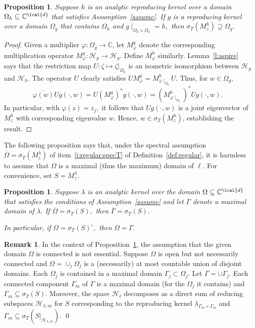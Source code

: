 \documentclass[a4paper,reqno,index]{amsart}
\numberwithin{equation}{section}
\newcommand{\CC}{\mathbb{C}}
\newcommand{\cH}{\mathcal{H}}
\newcommand{\specT}{\sigma_T}  %
\newcommand{\genl}{\lambda} %
\newcommand{\ol}[1]{\overline{#1}}
\newcommand{\psif}{\zeta}
\newtheorem{proposition}[theorem]{Proposition}
\theoremstyle{definition}
\newtheorem{remark}[theorem]{Remark}
\begin{document}
\begin{proposition}
    \label{p:oops-extended}
      Suppose $h$ is an analytic reproducing kernel over a domain $\Omega_h\subseteq \CC^{\lcal{d}}$ 
      that satisfies Assumption~\ref{assume}. If $g$ is a reproducing kernel over a domain $\Omega_g$
      that contains $\Omega_h$ and $g\mid_{\Omega_h\times \Omega_h}=h,$ then $\specT(M^h_z) \supseteq \Omega_g.$
\end{proposition}

\begin{proof}
    Given a multiplier $\varphi:\Omega_g\to\CC$, let $M^g_\varphi$ denote the corresponding
    multiplication operator $M^g_\varphi:\cH_g\to\cH_g.$ Define $M^h_\varphi$ similarly. Lemma~\ref{l:aspire} says that the restriction map $U: \psif\mapsto \psif\vert_{\Omega_h}$
  is an isometric isomorphism between $\cH_g$ and $\cH_h$. The operator $U$ clearly satisfies
     $UM^g_\varphi= M^h_{\varphi\mid_{\Omega_h}} U.$  Thus, for $w\in\Omega_g,$
\[
   \ol{\varphi(w)} U g(\cdot,w) =   U (M^g_\varphi)^*  g(\cdot,w)=  (M^h_{\varphi\mid_{\Omega_h}})^* U g(\cdot,w).
\]
  In particular, with $\varphi(z)=z_j,$  it follows that $U g(\cdot,w)$ is a joint eigenvector of
  $M^h_z$ with corresponding eigenvalue $w.$ Hence, $w\in \specT(M^h_z)$, establishing the result.
\end{proof}

 

The following proposition says that, under the spectral
assumption $\ol{\Omega}=\specT(M^{\genl}_z)$ of item~\ref{i:regular:specT} of Definition~\ref{def:regular},
it is harmless to assume that $\Omega$ is a maximal (thus the
maximum) domain of $\ell.$ For convenience, set $S=M_z^{\genl}.$

 
 \begin{proposition}
 \label{p:spec-cond}
   Suppose  $\genl$ is an analytic kernel over the domain $\Omega\subseteq \CC^{\lcal{d}}$ that  
   satisfies the conditions of Assumption~\ref{assume} and let $\Gamma$ denote 
   a maximal   domain of $\genl.$  If $\ol{\Omega} = \specT(S),$ then  $\ol{\Gamma}=\specT(S).$

   In particular, if $\Omega =\specT(S)^\circ,$
   then $\Omega=\Gamma.$  
 \end{proposition}



\begin{remark}\rm
  In the context of Proposition~\ref{p:spec-cond}, the assumption
  that the given domain $\Omega$ is connected is not essential. 
  Suppose  $\Omega$ is open but not necessarily connected
   and $\Omega=\cup_j \Omega_j$ is a (necessarily) at most countable
   union of  disjoint  domains. Each $\Omega_j$ is contained in a maximal
   domain $\Gamma_j\subset \Omega_j.$ Let $\Gamma=\cup \Gamma_j.$ 
   Each connected component $\Gamma_m$ of $\Gamma$  is a maximal
   domain (for the $\Omega_j$ it contains) and 
   $\Gamma_m\subseteq \specT(S).$ Moreover, 
   the space $\cH_\ell$ decomposes as a direct sum
   of reducing subspaces $\cH_{\genl,m}$ for $S$ corresponding 
   to the reproducing kernel $\genl_{\Gamma_m\times\Gamma_m}$
   and $\Gamma_m \subseteq \specT(S|_{\cH_{\genl,m}}).$
\qed\end{remark}
\end{document}
